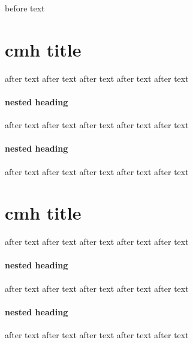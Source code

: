 before text

\section{cmh title}
	after text
	after text
	after text
	after text
	after text
	
	\paragraph{nested heading}
		
		after text
		after text
		after text
		after text
		after text
		
	\paragraph{nested heading}
		
		after text
		after text
		after text
		after text
		after text
		
\section{cmh title}
	
	after text
	after text
	after text
	after text
	after text
	
	\paragraph{nested heading}
		
		after text
		after text
		after text
		after text
		after text
		
	\paragraph{nested heading}
		after text
		after text
		after text
		after text
		after text
		
